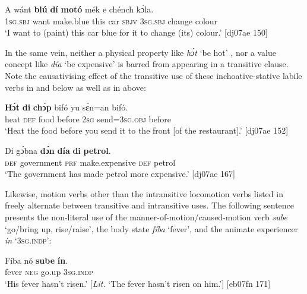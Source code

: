\ea%
    \label{ex:key:1105}
    \gll A    wánt  \textbf{blú}      \textbf{dí}  \textbf{motó}  mék    e    chénch  kɔ́la.\\
\textsc{1sg.sbj}  want  make.blue  this  car    \textsc{sbjv}    \textsc{3sg.sbj}  change  colour\\

\glt ‘I want to (paint) this car blue for it to change (its) colour.’ [dj07ae 150]
\z

In the same vein, neither a physical property like \textit{hɔ́t} ‘be hot’ , nor a value concept like \textit{día} ‘be expensive’  is barred from appearing in a transitive clause. Note the causativising effect of the transitive use of these inchoative-stative labile verbs in  and  below as well as in  above: 

\ea%
    \label{ex:key:1106}
    \gll \textbf{Hɔ́t}    \textbf{di}  \textbf{chɔ́p}  bifó    yu  sɛ́n=an    bifó.\\
heat    \textsc{def}  food    before  \textsc{2sg}  send=\textsc{3sg.obj}  before\\

\glt ‘Heat the food before you send it to the front [of the restaurant].’ [dj07ae 152]
\z


\ea%
    \label{ex:key:1107}
    \gll Di  gɔ́bna    \textbf{dɔ́n}  \textbf{día}        \textbf{di}  \textbf{petrol}.\\
\textsc{def}  government  \textsc{prf}  make.expensive  \textsc{def}  petrol\\

\glt ‘The government has made petrol more expensive.’ [dj07ae 167]
\z

Likewise, motion verbs other than the intransitive locomotion verbs listed in  freely alternate between transitive and intransitive uses. The following sentence presents the non-literal use of the manner-of-motion/caused-motion verb \textit{sube} ‘go/bring up, rise{\slash}raise’, the body state \textit{fíba} ‘fever’, and the animate experiencer \textit{ín} ‘\textsc{3sg.indp}’: 


\ea%
    \label{ex:key:1108}
    \gll Fíba    nó  \textbf{sube}  \textbf{ín}.\\
fever  \textsc{neg}  go.up  \textsc{3sg.indp}\\

\glt ‘His fever hasn’t risen.’ [\textit{Lit.} ‘The fever hasn’t risen on him.’] [eb07fn 171]
\z

